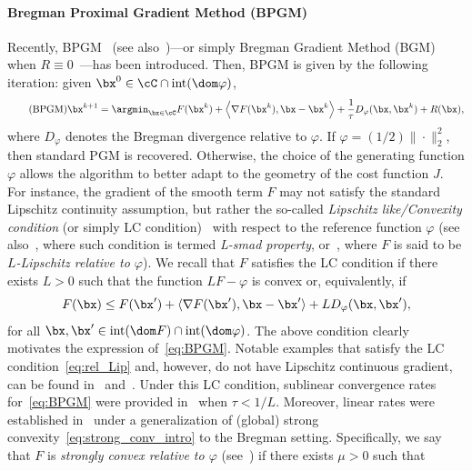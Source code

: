 \documentclass[11pt]{amsart}
\begin{document}
\paragraph{\textbf{Bregman Proximal Gradient Method (BPGM)}}
Recently, BPGM~\cite{bauschke2017descent} (see also~\cite{Bolte2018,lu2018relatively,Teboulle2018,Zhou2019})---or simply Bregman Gradient Method (BGM) when $R \equiv 0$~\cite{AusTeb2006,Tseng2010}---has been introduced. Then, BPGM is given by the following iteration: given $\bx^0\in \cC \cap \mathrm{int}(\dom\varphi)$,
\begin{equation}\label{eq:BPGM}
\tag{BPGM}
\bx^{k+1} = \argmin_{\bx \in \cC} F(\bx^k) + \left<\nabla F(\bx^{k}), \bx - \bx^{k} \right> + \frac1\tau D_{\varphi}(\bx,\bx^k) + R(\bx),
\end{equation}
where $D_\varphi$ denotes the  Bregman divergence relative to $\varphi$. If $\varphi=(1/2)\|\cdot\|_2^2$, then standard PGM is recovered. Otherwise, the choice of the generating function $\varphi$ allows the algorithm to better adapt to the geometry of the cost function $J$. For instance, the gradient of the smooth term $F$ may not satisfy the standard Lipschitz continuity assumption, but rather the so-called \emph{Lipschitz like/Convexity condition} (or simply LC condition)~\cite{bauschke2017descent} with respect to the reference function $\varphi$ (see also~\cite{Bolte2018}, where such condition is termed \emph{L-smad property}, or~\cite{lu2018relatively}, where $F$ is said to be \emph{$L$-Lipschitz relative to $\varphi$}). We recall that $F$ satisfies the LC condition if there exists $L>0$ such that the function $LF-\varphi$ is convex or, equivalently, if 
\begin{equation}\label{eq:rel_Lip}
F(\bx)\leq F(\bx')+\langle\nabla F(\bx'),\bx-\bx' \rangle +L D_\varphi(\bx,\bx'),
\end{equation}
for all $\bx,\bx'\in\mathrm{int}(\dom F)\cap\mathrm{int}(\dom \varphi)$. The above condition clearly motivates the expression of~\cref{eq:BPGM}. Notable examples that satisfy the LC condition~\cref{eq:rel_Lip} and, however, do not have Lipschitz continuous gradient, can be found in~\cite[Section 2]{bauschke2017descent} and~\cite[Section 2]{lu2018relatively}. Under this LC condition, sublinear convergence rates for~\eqref{eq:BPGM} were provided in~\cite{bauschke2017descent} when $\tau < 1/L$. Moreover,  linear rates were established in~\cite{lu2018relatively,Teboulle2018} under a generalization of (global) strong convexity~\cref{eq:strong_conv_intro} to the Bregman setting. Specifically, we say that $F$ is \emph{strongly convex relative to $\varphi$} (see~\cite[Definition 4.1]{Bartlett2007}) if there exists $\mu>0$ such that
\end{document}
